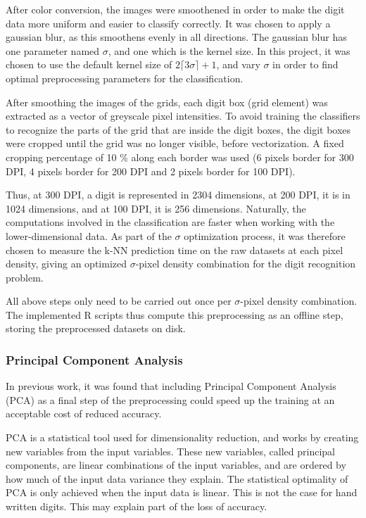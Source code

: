 After color conversion, the images were smoothened in order
to make the digit data more uniform and easier to classify correctly.
It was chosen to apply a gaussian blur, as this smoothens
evenly in all directions.
The gaussian blur has one parameter named \(\sigma\),
and one which is the kernel size.
In this project, it was chosen to use the default
kernel size of \(2 \lceil3\sigma\rceil +1\),
and vary \(\sigma\) in order to find
optimal preprocessing parameters for the classification.

After smoothing the images of the grids,
each digit box (grid element) was extracted
as a vector of greyscale pixel intensities.
To avoid training the classifiers to recognize the parts
of the grid that are inside the digit boxes,
the digit boxes were cropped until the grid was no longer visible,
before vectorization.
A fixed cropping percentage of 10 \% along each border was used
(6 pixels border for 300 DPI, 4 pixels border for 200 DPI and 2 pixels border for 100 DPI).

Thus, at 300 DPI, a digit is represented in 2304 dimensions,
at 200 DPI, it is in 1024 dimensions,
and at 100 DPI, it is 256 dimensions.
Naturally, the computations involved in the classification
are faster when working with the lower-dimensional data.
As part of the \(\sigma\) optimization process,
it was therefore chosen to measure the k-NN prediction time
on the raw datasets at each pixel density,
giving an optimized \(\sigma\)-pixel density combination
for the digit recognition problem.

All above steps only need to be carried out once per
\(\sigma\)-pixel density combination.
The implemented R scripts thus compute this preprocessing
as an offline step, storing the preprocessed
datasets on disk.

\subsubsection{Principal Component Analysis}
In previous work, it was found that including Principal Component Analysis (PCA)
as a final step of the preprocessing could speed up the training
at an acceptable cost of reduced accuracy.

PCA is a statistical tool used for dimensionality reduction,
and works by creating new variables from the input variables.
These new variables, called principal components,
are linear combinations of the input variables,
and are ordered by how much of the input data variance they explain.
The statistical optimality of PCA is only achieved
when the input data is linear. This is not the case
for hand written digits. This may explain part
of the loss of accuracy.

